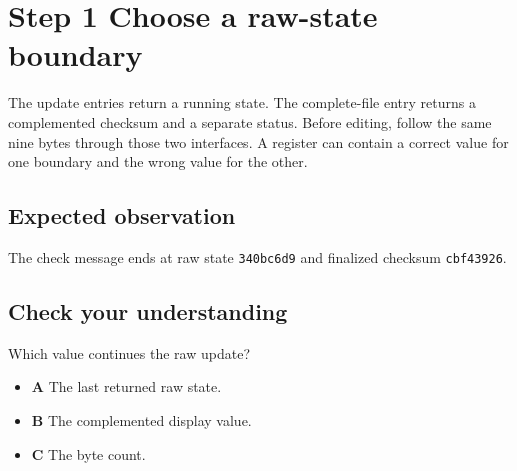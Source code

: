 \section{Step 1 Choose a raw-state boundary}\label{crc-s01}

The update entries return a running state. The complete-file entry returns a complemented checksum and a separate status. Before editing, follow the same nine bytes through those two interfaces. A register can contain a correct value for one boundary and the wrong value for the other.

\subsection{Expected observation}
The check message ends at raw state \texttt{340bc6d9} and finalized checksum \texttt{cbf43926}.

\subsection{Check your understanding}
Which value continues the raw update?

\begin{itemize}
\item \textbf{A} The last returned raw state.
\item \textbf{B} The complemented display value.
\item \textbf{C} The byte count.
\end{itemize}
